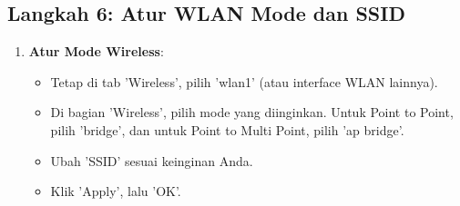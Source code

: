 \subsection*{Langkah 6: Atur WLAN Mode dan SSID}
\begin{enumerate}
    \item \textbf{Atur Mode Wireless}:
    \begin{itemize}
        \item Tetap di tab 'Wireless', pilih 'wlan1' (atau interface WLAN lainnya).
        \item Di bagian 'Wireless', pilih mode yang diinginkan. Untuk Point to Point, pilih 'bridge', dan untuk Point to Multi Point, pilih 'ap bridge'.
        \item Ubah 'SSID' sesuai keinginan Anda.
        \item Klik 'Apply', lalu 'OK'.
    \end{itemize}
\end{enumerate}